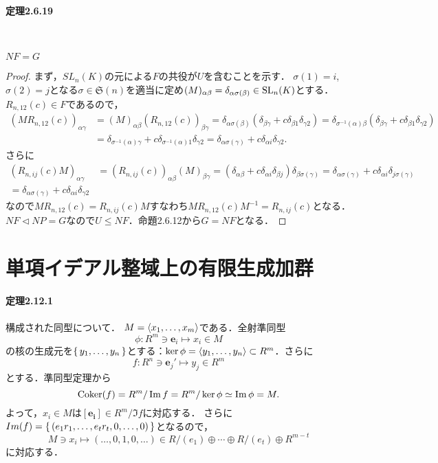 \documentclass[a4paper]{ltjsreport}
\begin{document}
\paragraph{定理2.6.19}~
\begin{screen}
  \(NF=G\)
\end{screen}
\begin{proof}
  まず，\(SL_n(K)\)の元による\(F\)の共役が\(U\)を含むことを示す．
  \(\sigma(1)=i\), \(\sigma(2)=j\)となる\(\sigma\in\mathfrak{S}(n)\)を適当に定め\((M)_{\alpha\beta} = \delta_{\alpha\sigma(\beta)} \in \operatorname{SL}_n(K)\)とする．
  \(R_{n,12}(c) \in F\)であるので，
  \begin{align*}
    (MR_{n,12}(c))_{\alpha\gamma} &= (M)_{\alpha\beta} (R_{n,12}(c))_{\beta\gamma}
    = \delta_{\alpha\sigma(\beta)} (\delta_{\beta\gamma} + c\delta_{\beta1}\delta_{\gamma2})
    = \delta_{\sigma^{-1}(\alpha)\beta} (\delta_{\beta\gamma} + c\delta_{\beta1}\delta_{\gamma2}) \\
    &= \delta_{\sigma^{-1}(\alpha)\gamma} + c \delta_{\sigma^{-1}(\alpha)1}\delta_{\gamma2}
    = \delta_{\alpha\sigma(\gamma)} + c \delta_{\alpha i}\delta_{\gamma2}.
  \end{align*}
  さらに
  \begin{align*}
    (R_{n,ij}(c)M)_{\alpha\gamma} &= (R_{n,ij}(c))_{\alpha\beta} (M)_{\beta\gamma}
    = (\delta_{\alpha\beta} + c\delta_{\alpha i}\delta_{\beta j}) \delta_{\beta\sigma(\gamma)}
    = \delta_{\alpha\sigma(\gamma)} + c \delta_{\alpha i}\delta_{j\sigma(\gamma)} \\
    = \delta_{\alpha\sigma(\gamma)} + c \delta_{\alpha i}\delta_{\gamma2}
  \end{align*}
  なので\(MR_{n,12}(c) = R_{n,ij}(c)M\)すなわち\(MR_{n,12}(c)M^{-1} = R_{n,ij}(c)\)となる．
  \(NF\triangleleft NP=G\)なので\(U \leq NF\)．命題2.6.12から\(G=NF\)となる．
\end{proof}

\setcounter{section}{11}
\section{単項イデアル整域上の有限生成加群}
\paragraph{定理2.12.1}
構成された同型について．
\(M=\braket{x_1, \ldots, x_m}\)である．全射準同型
\[ \phi \colon R^m \ni \boldsymbol{e}_i \mapsto x_i \in M \]
の核の生成元を\(\set{y_1, \ldots, y_n}\)とする：\(\ker\phi = \braket{y_1, \ldots, y_n} \subset R^m\)．さらに
\[ f \colon R^n \ni \boldsymbol{e}_j' \mapsto y_j \in R^m \]
とする．準同型定理から
\[
\operatorname{Coker}(f) = R^m / \operatorname{Im} f = R^m / \ker\phi \simeq \operatorname{Im}\phi = M .
\]
よって，\(x_i \in M\)は\([\boldsymbol{e_i}] \in R^m / \Im f\)に対応する．
さらに\(Im(f) = \set{(e_1r_1, \ldots, e_tr_t, 0, \ldots, 0)}\)となるので，
\[ M \ni x_i \mapsto (\ldots, 0, 1, 0, \ldots) \in R/(e_1) \oplus \cdots \oplus R/(e_t) \oplus R^{m-t} \]
に対応する．
\end{document}
